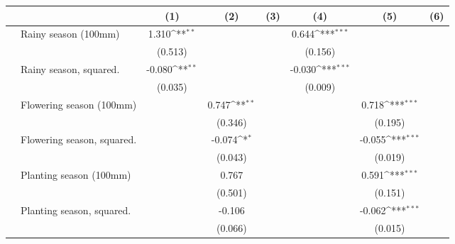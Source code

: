 {
\def\sym#1{\ifmmode^{#1}\else\(^{#1}\)\fi}
\begin{tabular}{l*{6}{c}}
\hline\hline
                    &\multicolumn{1}{c}{(1)}         &\multicolumn{1}{c}{(2)}         &\multicolumn{1}{c}{(3)}         &\multicolumn{1}{c}{(4)}         &\multicolumn{1}{c}{(5)}         &\multicolumn{1}{c}{(6)}         \\
\hline
~~Rainy season (100mm)&       1.310\sym{**} &                     &                     &       0.644\sym{***}&                     &                     \\
                    &     (0.513)         &                     &                     &     (0.156)         &                     &                     \\
~~Rainy season, squared.&      -0.080\sym{**} &                     &                     &      -0.030\sym{***}&                     &                     \\
                    &     (0.035)         &                     &                     &     (0.009)         &                     &                     \\
~~Flowering season (100mm)&                     &       0.747\sym{**} &                     &                     &       0.718\sym{***}&                     \\
                    &                     &     (0.346)         &                     &                     &     (0.195)         &                     \\
~~Flowering season, squared.&                     &      -0.074\sym{*}  &                     &                     &      -0.055\sym{***}&                     \\
                    &                     &     (0.043)         &                     &                     &     (0.019)         &                     \\
~~Planting season (100mm)&                     &       0.767         &                     &                     &       0.591\sym{***}&                     \\
                    &                     &     (0.501)         &                     &                     &     (0.151)         &                     \\
~~Planting season, squared.&                     &      -0.106         &                     &                     &      -0.062\sym{***}&                     \\
                    &                     &     (0.066)         &                     &                     &     (0.015)         &                     \\

\end{tabular}}
